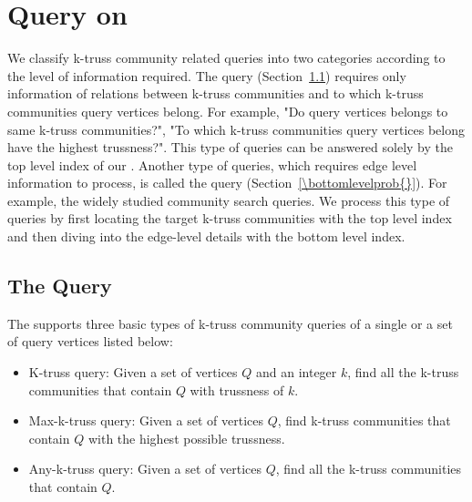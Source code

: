 \section{Query on \TwoLevelIndex{}}
\label{query}

We classify k-truss community related queries into two categories according to the level of information required. The \toplevelprob{} query (Section~\ref{\toplevelprob{}}) requires only information of relations between k-truss communities and to which k-truss communities query vertices belong. For example, "Do query vertices belongs to same k-truss communities?", "To which k-truss communities query vertices belong have the highest trussness?". This type of queries can be answered solely by the top level index of our \twolevelindex{}. Another type of queries, which requires edge level information to process, is called the \bottomlevelprob{} query (Section~\ref{\bottomlevelprob{}}). For example, the widely studied community search queries. We process this type of queries by first locating the target k-truss communities with the top level index and then diving into the edge-level details with the bottom level index. 

\subsection{The \TopLevelProb{} Query}
\label{\toplevelprob{}}

The \twolevelindex supports three basic types of \toplevelprob{} k-truss community queries of a single or a set of query vertices listed below: 
\begin{itemize}
	\item{K-truss query:} Given a set of vertices $Q$ and an integer $k$, find all the k-truss communities that contain $Q$ with trussness of $k$.
	\item{Max-k-truss query:} Given a set of vertices $Q$, find k-truss communities that contain $Q$ with the highest possible trussness.
	\item{Any-k-truss query:} Given a set of vertices $Q$, find all the k-truss communities that contain $Q$.
\end{itemize}


